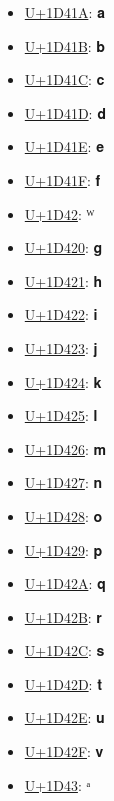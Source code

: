 \begin{itemize}
	\item \href{https://www.compart.com/en/unicode/U+1D41A}{U+1D41A}: 𝐚
	\item \href{https://www.compart.com/en/unicode/U+1D41B}{U+1D41B}: 𝐛
	\item \href{https://www.compart.com/en/unicode/U+1D41C}{U+1D41C}: 𝐜
	\item \href{https://www.compart.com/en/unicode/U+1D41D}{U+1D41D}: 𝐝
	\item \href{https://www.compart.com/en/unicode/U+1D41E}{U+1D41E}: 𝐞
	\item \href{https://www.compart.com/en/unicode/U+1D41F}{U+1D41F}: 𝐟
	\item \href{https://www.compart.com/en/unicode/U+1D42}{U+1D42}: ᵂ
	\item \href{https://www.compart.com/en/unicode/U+1D420}{U+1D420}: 𝐠
	\item \href{https://www.compart.com/en/unicode/U+1D421}{U+1D421}: 𝐡
	\item \href{https://www.compart.com/en/unicode/U+1D422}{U+1D422}: 𝐢
	\item \href{https://www.compart.com/en/unicode/U+1D423}{U+1D423}: 𝐣
	\item \href{https://www.compart.com/en/unicode/U+1D424}{U+1D424}: 𝐤
	\item \href{https://www.compart.com/en/unicode/U+1D425}{U+1D425}: 𝐥
	\item \href{https://www.compart.com/en/unicode/U+1D426}{U+1D426}: 𝐦
	\item \href{https://www.compart.com/en/unicode/U+1D427}{U+1D427}: 𝐧
	\item \href{https://www.compart.com/en/unicode/U+1D428}{U+1D428}: 𝐨
	\item \href{https://www.compart.com/en/unicode/U+1D429}{U+1D429}: 𝐩
	\item \href{https://www.compart.com/en/unicode/U+1D42A}{U+1D42A}: 𝐪
	\item \href{https://www.compart.com/en/unicode/U+1D42B}{U+1D42B}: 𝐫
	\item \href{https://www.compart.com/en/unicode/U+1D42C}{U+1D42C}: 𝐬
	\item \href{https://www.compart.com/en/unicode/U+1D42D}{U+1D42D}: 𝐭
	\item \href{https://www.compart.com/en/unicode/U+1D42E}{U+1D42E}: 𝐮
	\item \href{https://www.compart.com/en/unicode/U+1D42F}{U+1D42F}: 𝐯
	\item \href{https://www.compart.com/en/unicode/U+1D43}{U+1D43}: ᵃ

\end{itemize}
